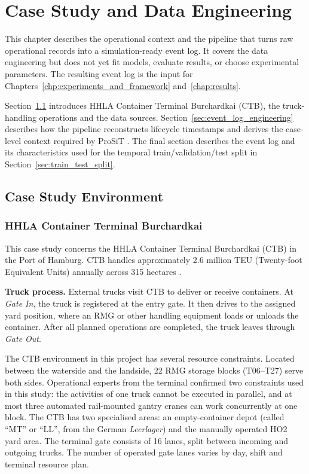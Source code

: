 \chapter{Case Study and Data Engineering}
\label{chp:case_study_and_data}

This chapter describes the operational context and the pipeline that turns raw operational
records into a simulation-ready event log. It covers the data engineering but does not yet fit models, evaluate results, or choose experimental parameters. The resulting event log is the input for Chapters~\ref{chp:experiments_and_framework} and~\ref{chap:results}.

Section~\ref{sec:cs_environment} introduces HHLA Container Terminal
Burchardkai (CTB), the truck-handling operations and the data sources.
Section~\ref{sec:event_log_engineering} describes how the pipeline reconstructs lifecycle timestamps and derives the case-level context required by ProSiT
\cite{Vinci2026prosit}. The final section describes the event log and its
characteristics used for the temporal train/validation/test split in
Section~\ref{sec:train_test_split}.

\section{Case Study Environment}
\label{sec:cs_environment}

    \subsection{HHLA Container Terminal Burchardkai}

    This case study concerns the HHLA Container Terminal Burchardkai (CTB) in the Port of Hamburg. CTB handles approximately 2.6 million TEU
    (Twenty-foot Equivalent Units) annually across 315 hectares
    \cite{hhla2025}.

    \textbf{Truck process.} External trucks visit CTB to deliver or receive
    containers. At \textit{Gate In}, the truck is registered at the entry
    gate. It then drives to the assigned yard position, where an RMG or other
    handling equipment loads or unloads the container. After all planned
    operations are completed, the truck leaves through \textit{Gate Out}.

    The CTB environment in this project has several resource constraints.
    Located between the waterside and the landside, 22 RMG storage
    blocks (T06--T27) serve both sides. Operational experts from the terminal
    confirmed two constraints used in this study: the activities of one truck
    cannot be executed in parallel, and at most three automated rail-mounted
    gantry cranes can work concurrently at one block. The CTB
    has two specialised areas: an empty-container depot (called
    ``MT'' or ``LL'', from the German \textit{Leerlager}) and the
    manually operated HO2 yard area. The terminal gate consists of 16
    lanes, split between incoming and outgoing trucks. The number of
    operated gate lanes varies by day, shift and terminal resource plan.

